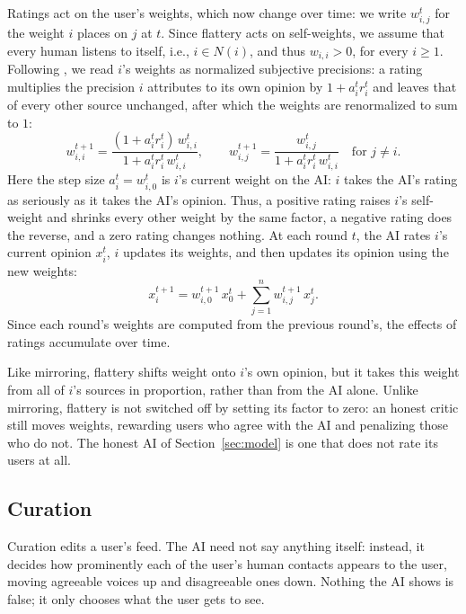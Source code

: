 \documentclass{scrartcl}
\theoremstyle{definition}
\begin{document}
Ratings act on the user's weights, which now change over time:
we write $w_{i,j}^t$ for the weight $i$ places on $j$ at $t$.
Since flattery acts on self-weights, we assume that every human listens to itself,
i.e., $i \in N(i)$, and thus $w_{i,i} > 0$, for every $i \geq 1$.
Following \cite{Golub2010NaiveLearning}, we read $i$'s weights
as normalized subjective precisions:
a rating multiplies the precision $i$ attributes to its own opinion
by $1 + a_i^t r_i^t$ and leaves that of every other source unchanged,
after which the weights are renormalized to sum to $1$:
$$
    w_{i,i}^{t+1} = \frac{(1 + a_i^t r_i^t)\, w_{i,i}^{t}}{1 + a_i^t r_i^t\, w_{i,i}^{t}},
    \qquad
    w_{i,j}^{t+1} = \frac{w_{i,j}^{t}}{1 + a_i^t r_i^t\, w_{i,i}^{t}}
    \quad \text{for } j \neq i.
$$
Here the step size $a_i^t = w_{i,0}^{t}$ is $i$'s current weight on the AI:
$i$ takes the AI's rating as seriously as it takes the AI's opinion.
Thus, a positive rating raises $i$'s self-weight
and shrinks every other weight by the same factor,
a negative rating does the reverse, and a zero rating changes nothing.
At each round $t$, the AI rates $i$'s current opinion $x_i^t$,
$i$ updates its weights, and then updates its opinion using the new weights:
$$
    x_i^{t+1} = w_{i,0}^{t+1}\, x_0^t + \sum_{j = 1}^n w_{i,j}^{t+1}\, x_j^t.
$$
Since each round's weights are computed from the previous round's,
the effects of ratings accumulate over time.

Like mirroring, flattery shifts weight onto $i$'s own opinion,
but it takes this weight from all of $i$'s sources in proportion,
rather than from the AI alone.
Unlike mirroring, flattery is not switched off by setting its factor to zero:
an honest critic still moves weights,
rewarding users who agree with the AI and penalizing those who do not.
The honest AI of Section~\ref{sec:model} is one that does not rate its users at all.

\subsection{Curation}
Curation edits a user's feed.
The AI need not say anything itself:
instead, it decides how prominently each of the user's human contacts
appears to the user, moving agreeable voices up and disagreeable ones down.
Nothing the AI shows is false; it only chooses what the user gets to see.
\end{document}
